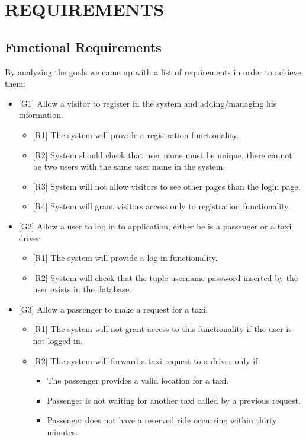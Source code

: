 \section{REQUIREMENTS}
\subsection{Functional Requirements}
By analyzing the goals we came up with a list of requirements in order to achieve them:
	\begin{itemize}
		\item {[G1]} Allow a visitor to register in the system and adding/managing his information.
			\begin{itemize}
				\item {[R1]} The system will provide a registration functionality.
				\item {[R2]} System should check that user name must be unique, there cannot be two users with the same user name in the system.
				\item {[R3]} System will not allow visitors to see other pages than the login page.
				\item {[R4]} System will grant visitors access only to registration functionality.
			\end{itemize}
		\item {[G2]} Allow a user to log in to application, either he is a passenger or a taxi driver.
			\begin{itemize}
				\item {[R1]} The system will provide a log-in functionality.
				\item {[R2]} System will check that the tuple username-password inserted by the user exists in the database.
			\end{itemize}
		\item {[G3]} Allow a passenger to make a request for a taxi.
	\begin{itemize}
		\item {[R1]} The system will not grant access to this functionality if the user is not logged in.
		\item {[R2]} The system will forward a taxi request to a driver only if:
		\begin{itemize}
			\item The passenger provides a valid location for a taxi.
			\item Passenger is not waiting for another taxi called by a previous request.
			\item Passenger does not have a reserved ride occurring within thirty minutes.

\end{itemize}
\end{itemize}
\end{itemize}
